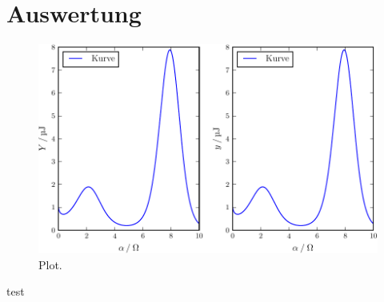 \section{Auswertung}
\label{sec:Auswertung}

\begin{figure}
  \centering
  \includegraphics{pc/plot.pdf}
  \caption{Plot.}
  \label{fig:plot}
\end{figure}
test


